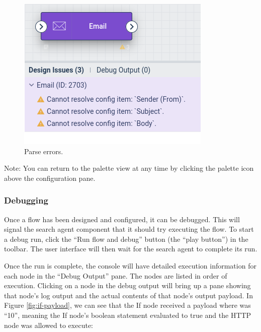 \begin{figure}
	\includegraphics[width=0.85\linewidth]{images/parse-errors.png}
	\caption{Parse errors.}
	\label{fig:parse-errors}
\end{figure}

Note: You can return to the palette view at any time by clicking the palette icon above the configuration pane.

\subsubsection{Debugging}

Once a flow has been designed and configured, it can be debugged. This will signal the search agent component that it should try executing the flow. To start a debug run, click the ``Run flow and debug'' button (the ``play button'') in the toolbar. The user interface will then wait for the search agent to complete its run.

Once the run is complete, the console will have detailed execution information for each node in the ``Debug Output'' pane. The nodes are listed in order of execution. Clicking on a node in the debug output will bring up a pane showing that node's log output and the actual contents of that node's output payload. In Figure \ref{fig:if-payload}, we can see that the If node received a payload where  was ``10'', meaning the If node's boolean statement evaluated to true and the HTTP node was allowed to execute:

